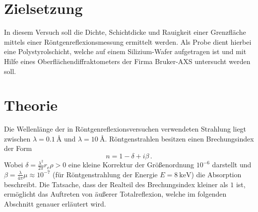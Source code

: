 \section{Zielsetzung}
In diesem Versuch soll die Dichte, Schichtdicke und Rauigkeit einer Grenzfläche mittels einer Röntgenreflexionsmessung ermittelt werden.
Als Probe dient hierbei eine Polystyrolschicht, welche auf einem Silizium-Wafer aufgetragen ist und mit Hilfe eines Oberflächendiffraktometers der Firma Bruker-AXS untersucht werden soll.

\section{Theorie}
Die Wellenlänge der in Röntgenreflexionsversuchen verwendeten Strahlung liegt zwischen $\lambda = \SI{0,1}{\angstrom}$ und $\lambda = \SI{10}{\angstrom}$.
Röntgenstrahlen besitzen einen Brechungsindex der Form
\begin{equation}
    n=1-\delta + i \beta \, .
\end{equation}
Wobei $\delta = \frac{\lambda^2}{2\pi}r_e\rho > 0$ eine kleine Korrektur der Größenordnung $10^{-6}$ darstellt und $\beta = \frac{\lambda}{4\pi}\mu \approx 10^{-7}$ (für Röntgenstrahlung der Energie $E=\SI{8}{\keV}$) die Absorption beschreibt.
Die Tatsache, dass der Realteil des Brechungsindex kleiner als $1$ ist, ermöglicht das Auftreten von äußerer Totalreflexion, welche im folgenden Abschnitt genauer erläutert wird.

